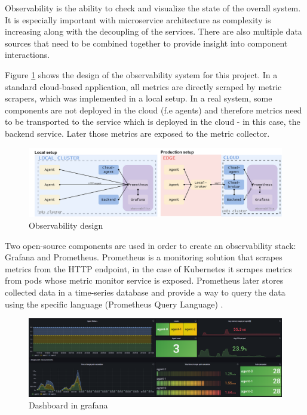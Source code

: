 Observability is the ability to check and visualize the state of the overall system. It is especially important with microservice architecture as complexity is increasing along with the decoupling of the services. There are also multiple data sources that need to be combined together to provide insight into component interactions. 

Figure \ref{fig:observability_system} shows the design of the observability system for this project. In a standard cloud-based application, all metrics are directly scraped by metric scrapers, which was implemented in a local setup. In a real system, some components are not deployed in the cloud (f.e agents) and therefore metrics need to be transported to the service which is deployed in the cloud - in this case, the backend service. Later those metrics are exposed to the metric collector.

\begin{figure}[H]
    \centering
    \includegraphics[width=\textwidth]{pictures/observability.png}
    \caption{Observability design}
    \label{fig:observability_system}
\end{figure}

Two open-source components are used in order to create an observability stack: Grafana and Prometheus. Prometheus is a monitoring solution that scrapes metrics from the HTTP endpoint, in the case of Kubernetes it scrapes metrics from pods whose metric monitor service is exposed. Prometheus later stores collected data in a time-series database and provide a way to query the data using the specific language (Prometheus Query Language) \cite{prometheus_docs}.

\begin{figure}[H]
    \centering
    \includegraphics[width=\textwidth]{pictures/grafana.png}
    \caption{Dashboard in grafana}
    \label{fig:dashboard_grafana}
\end{figure}


